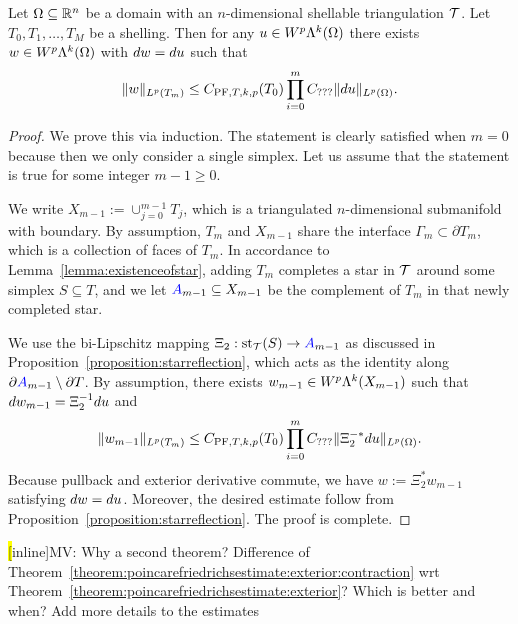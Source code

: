 \documentclass[10pt,letterpaper]{article}
\newcommand{\todo}[1]{{\colorbox{yellow}{#1}}}
\begin{document}
\begin{theorem}\label{theorem:poincarefriedrichsestimate:exterior:contraction}
    Let $\Omega \subseteq {\mathbb R}^{n}$ be a domain with an $n$-dimensional shellable triangulation ${\mathcal T}$.
    Let $T_0, T_1, \dots, T_M$ be a shelling.
    Then for any $u \in W^{p}\Lambda^{k}(\Omega)$ 
    there exists $w \in W^{p}\Lambda^{k}(\Omega)$ with $d w = d u$ 
    such that 
    \begin{align*}
        \| w \|_{L^{p}(T_{m})}
        \leq 
        C_{{\rm PF},T,k,p}(T_{0})
        \prod_{i=0}^{m} 
        C_{???}
        \| d u \|_{L^{p}(\Omega)}
        .
    \end{align*}
\end{theorem}
\begin{proof}
    We prove this via induction. 
    The statement is clearly satisfied when $m=0$ because then we only consider a single simplex. 
    Let us assume that the statement is true for some integer $m-1 \geq 0$.
    
    We write $X_{m-1} := \cup_{j=0}^{m-1} T_{j}$, 
    which is a triangulated $n$-dimensional submanifold with boundary.
    By assumption, $T_{m}$ and $X_{m-1}$ share the interface $\Gamma_{m} \subset \partial T_{m}$, 
    which is a collection of faces of $T_{m}$. 
    In accordance to Lemma~\ref{lemma:existenceofstar}, adding $T_{m}$ completes a star in ${\mathcal T}$ around some simplex $S \subseteq T$, 
    and we let ${\color{blue}A}_{m-1} \subseteq X_{m-1}$ be the complement of $T_{m}$ in that newly completed star. 
    
    We use the bi-Lipschitz mapping $\Xi_{2} : \operatorname{st}_{{\mathcal T}}(S) \rightarrow {\color{blue}A}_{m-1}$ as discussed in Proposition~\ref{proposition:starreflection},
    which acts as the identity along $\partial {\color{blue}A}_{m-1} \setminus \partial T$.
    By assumption, 
    there exists $w_{m-1} \in W^{p}\Lambda^{k}(X_{m-1})$ 
    such that $d w_{m-1} = \Xi_{2}^{-1} d u$ and 
    \begin{align*}
        \| w_{m-1} \|_{L^{p}(T_{m})}
        \leq 
        C_{{\rm PF},T,k,p}(T_{0})
        \prod_{i=0}^{m} 
        C_{???}
        \| \Xi_{2}^{-\ast} d u \|_{L^{p}(\Omega)}
        .
    \end{align*}
    Because pullback and exterior derivative commute, 
    we have $w := \Xi_{2}^{\ast} w_{m-1}$ satisfying $d w = d u$. 
    Moreover, the desired estimate follow from Proposition~\ref{proposition:starreflection}.
    The proof is complete. 
\end{proof}
\todo[inline]{MV: Why a second theorem? Difference of Theorem~\ref{theorem:poincarefriedrichsestimate:exterior:contraction} wrt Theorem~\ref{theorem:poincarefriedrichsestimate:exterior}? Which is better and when? Add more details to the estimates}
\end{document}
